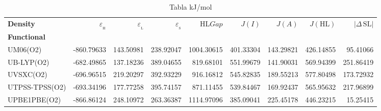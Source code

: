 \documentclass[preprint,landscape,12pt]{elsarticle}
\begin{document}
	\begin{table}
		\caption{ Tabla kJ/mol}
		\centering
		\footnotesize
		\begin{tabular}{lrrrrrrrr}
			\hline
			\textbf{Density}    & $\varepsilon_{_{\mathrm{H}}}$	& $\varepsilon_{_{\mathrm{L}}}$  & $\varepsilon_{_{\mathrm{S}}}$& HL$Gap$ & $J(I)$ & $J(A)$ & $J(\mathrm{HL})$  & \textbf{$\left|\Delta\,\mathrm{SL}\right|$}  \\
			\textbf{Functional} &   &  &     &   &  &  &  &  \\
			\hline \hline 

UM06(O2) & -860.79633 & 143.50981 & 238.92047 & 1004.30615 & 401.33304 & 143.29821 & 426.14855 & 95.41066\\
UB-LYP(O2) & -682.49865 & 137.18236 & 389.04655 & 819.68101 & 551.99679 & 141.90031 & 569.94399 & 251.86419\\
UVSXC(O2) & -696.96515 & 219.20297 & 392.93229 & 916.16812 & 545.82835 & 189.55213 & 577.80498 & 173.72932\\
UTPSS-TPSS(O2) & -693.34196 & 177.77258 & 395.74157 & 871.11455 & 539.84467 & 169.92437 & 565.95632 & 217.96899\\
UPBE1PBE(O2) & -866.86124 & 248.10972 & 263.36387 & 1114.97096 & 385.09041 & 225.45178 & 446.23215 & 15.25415\\

	 		\hline
		\end{tabular}
			\label{tab:kJ/mol}
	\end{table}
\end{document}
